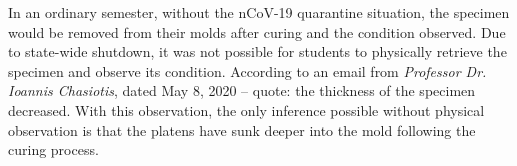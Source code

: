 In an ordinary semester, without the nCoV-19 quarantine situation, the specimen would be removed from their molds after curing and the condition observed.  Due to state-wide shutdown, it was not possible for students to physically retrieve the specimen and observe its condition.  According to an email from \emph{Professor Dr. Ioannis Chasiotis}, dated May 8, 2020 -- quote: the thickness of the specimen decreased.  With this observation, the only inference possible without physical observation is that the platens have sunk deeper into the mold following the curing process.